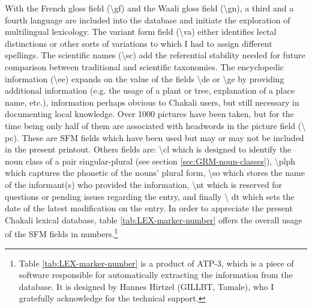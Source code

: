 With the French gloss field (\textbackslash gf) and the Waali gloss field
(\textbackslash gn),   a third and a fourth language are included into the
database and initiate the exploration of multilingual
lexicology. The variant form field (\textbackslash va) either identifies
lectal distinctions or other sorts of variations to which I had to assign
different
spellings.  The scientific names (\textbackslash sc)  add the referential
stability
needed for future comparison between traditional  and scientific  taxonomies. 
 The encyclopedic information (\textbackslash ee) expands on the value of
the fields  \textbackslash de or \textbackslash ge by providing
additional information (e.g. the usage of a plant or tree, explanation of a
place name, etc.),  information perhaps obvious to Chakali users, but still
necessary in
documenting local knowledge.  Over 1000 pictures have been taken, but for the
time being only  half of them  are associated with headwords in the picture
field (\textbackslash
pc).  These are SFM fields which have been
used but may or may not be included in the present printout.  Others  fields
are: 
\textbackslash cl  which is designed to identify the noun class of a pair
singular-plural (see section \ref{sec:GRM-noun-classes}),  \textbackslash plph
which
captures the
phonetic of the nouns' plural form, \textbackslash so which stores the name of
the
informant(s) who provided the information, \textbackslash nt  which is reserved
for questions or pending issues regarding the entry, and finally \textbackslash 
dt  which sets the date of the latest modification on the entry.  In order to
appreciate the present Chakali lexical database, 
table \ref{tab:LEX-marker-number} offers  the overall usage of  the
SFM fields in numbers.\footnote{Table \ref{tab:LEX-marker-number} is a product
of ATP-3,
which is a  piece
of software responsible for automatically extracting the information from the
database.  It is designed by Hannes Hirtzel (GILLBT, Tamale), who I gratefully
acknowledge for the technical support.} 








